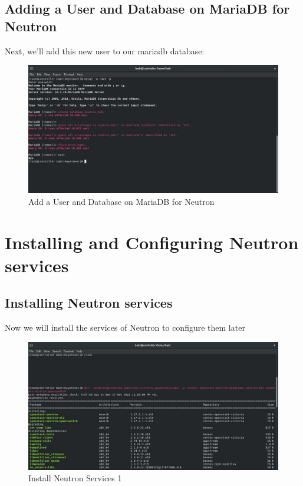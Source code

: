 \begin{spacing}{1.2}
\subsection{Adding a User and Database on MariaDB for Neutron}
\par Next, we'll add this new user to our mariadb database: 
\\
\begin{figure}[!htb] 
\begin{center} 
\includegraphics[width=1\linewidth]{Cloud/Neutron Setup in Keystone/Add a User and Database on MariaDB for Neutron} 
\end{center} 
\caption{Add a User and Database on MariaDB for Neutron} 
\end{figure} 
\FloatBarrier


\section{Installing and Configuring Neutron services}
\subsection{Installing Neutron services}

\par Now we will install the services of Neutron to configure them later 
\\
\begin{figure}[!htb] 
\begin{center} 
\includegraphics[width=1\linewidth]{Cloud/Installing and Configuring Neutron services/Install Neutron Services 1} 
\end{center} 
\caption{Install Neutron Services 1} 
\end{figure} 
\FloatBarrier
\\


\end{spacing}
